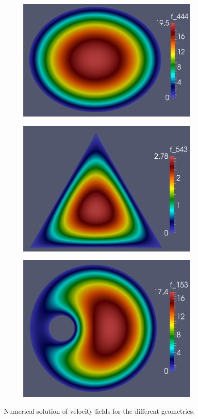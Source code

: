 \documentclass[11pt]{report}
\begin{document}
\begin{figure}[htb]
\begin{subfigure}{.3\textwidth}
	\centering
	\includegraphics[width=.9\linewidth]{images/ex1_47.png}
\end{subfigure}
\begin{subfigure}{.3\textwidth}
	\centering
	\includegraphics[width=.9\linewidth]{images/ex1_49.png}
\end{subfigure}
\begin{subfigure}{.3\textwidth}
	\centering
	\includegraphics[width=.9\linewidth]{images/ex1_52.png}
\end{subfigure}
\caption{Numerical solution of velocity fields for the different geometries.}
\end{figure}
\end{document}
